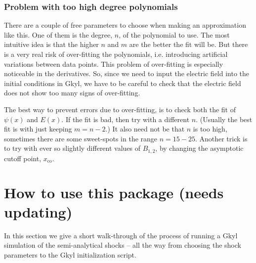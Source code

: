 \documentclass[11pt,a4paper, 
swedish, english %
]{article}
\begin{document}
\subsubsection{Problem with too high degree polynomials}
\label{sec:poly-deg}
There are a couple of free parameters to choose when making an
approximation like this. One of them is the degree, $n$, of the
polynomial to use. The most intuitive idea is that the higher $n$ and
$m$ are the better the fit will be. But there is a very real risk of
over-fitting the polynomials, i.e. introducing artificial variations
between data points. This problem of over-fitting is especially
noticeable in the derivatives. So, since we need to input the electric
field into the initial conditions in Gkyl, we have to be careful to
check that the electric field does not show too many signs of
over-fitting.

The best way to prevent errors due to over-fitting, is to check both
the fit of $\psi(x)$ and $E(x)$. If the fit is bad, then try with a
different $n$. (Usually the best fit is with just keeping $m=n-2$.) It
also need not be that $n$ is too high, sometimes there are some
sweet-spots in the range $n=15{-}25$. Another trick is to try with
ever so slightly different values of $B_{1,2}$, by changing the
asymptotic cutoff point, $x_\text{co}$.





\section{How to use this package (needs updating)}
\begin{center}
\noindent{}
\end{center}

In this section we give a short walk-through of the process of running
a Gkyl simulation of the semi-analytical shocks -- all the way from
choosing the shock parameters to the Gkyl initialization script. 
\end{document}
